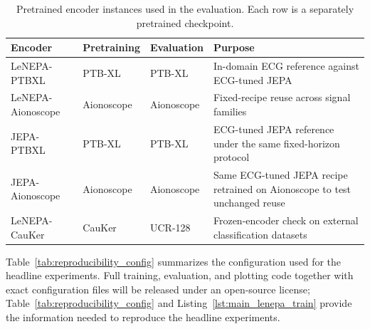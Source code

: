 \documentclass[sigconf,anonymous,review]{acmart}
\begin{document}
\begin{table}[t]
\centering
\caption{Pretrained encoder instances used in the evaluation. Each row is a separately pretrained checkpoint.}
\label{tab:lenepa_instances}
\small
\setlength{\tabcolsep}{3pt}
\begin{tabularx}{\linewidth}{l X X X}
\toprule
Encoder & Pretraining & Evaluation & Purpose \\
\midrule
LeNEPA-PTBXL
  & PTB-XL
  & PTB-XL
  & In-domain ECG reference against ECG-tuned JEPA \\
LeNEPA-Aionoscope
  & Aionoscope
  & Aionoscope
  & Fixed-recipe reuse across signal families \\
JEPA-PTBXL
  & PTB-XL
  & PTB-XL
  & ECG-tuned JEPA reference under the same fixed-horizon protocol \\
JEPA-Aionoscope
  & Aionoscope
  & Aionoscope
  & Same ECG-tuned JEPA recipe retrained on Aionoscope to test unchanged reuse \\
LeNEPA-CauKer
  & CauKer
  & UCR-128
  & Frozen-encoder check on external classification datasets \\
\bottomrule
\end{tabularx}
\end{table}

Table~\ref{tab:reproducibility_config} summarizes the configuration used for the headline experiments.
Full training, evaluation, and plotting code together with exact configuration files will be released under an open-source license; Table~\ref{tab:reproducibility_config} and Listing~\ref{lst:main_lenepa_train} provide the information needed to reproduce the headline experiments.
\end{document}
